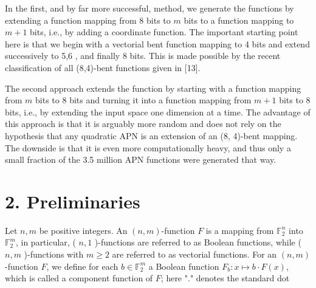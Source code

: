 \documentclass[10pt]{article}
\begin{document}
In the first, and by far more successful, method, we generate the functions by extending a function mapping from 8 bits to $m$ bits to a function mapping to $m+1$ bits, i.e., by adding a coordinate function. The important starting point here is that we begin with a vectorial bent function mapping to 4 bits and extend successively to 5,6 , and finally 8 bits. This is made possible by the recent classification of all (8,4)-bent functions given in [13].

The second approach extends the function by starting with a function mapping from $m$ bits to 8 bits and turning it into a function mapping from $m+1$ bits to 8 bits, i.e., by extending the input space one dimension at a time. The advantage of this approach is that it is arguably more random and does not rely on the hypothesis that any quadratic APN is an extension of an (8, 4)-bent mapping. The downside is that it is even more computationally heavy, and thus only a small fraction of the 3.5 million APN functions were generated that way.

\section*{2. Preliminaries}
Let $n, m$ be positive integers. An $(n, m)$-function $F$ is a mapping from $\mathbb{F}_{2}^{n}$ into $\mathbb{F}_{2}^{m}$, in particular, ( $n, 1$ )-functions are referred to as Boolean functions, while ( $n, m$ )-functions with $m \geq 2$ are referred to as vectorial functions. For an $(n, m)$-function $F$, we define for each $b \in \mathbb{F}_{2}^{m}$ a Boolean function $F_{b}: x \mapsto b \cdot F(x)$, which is called a component function of $F$; here "." denotes the standard dot
\end{document}
